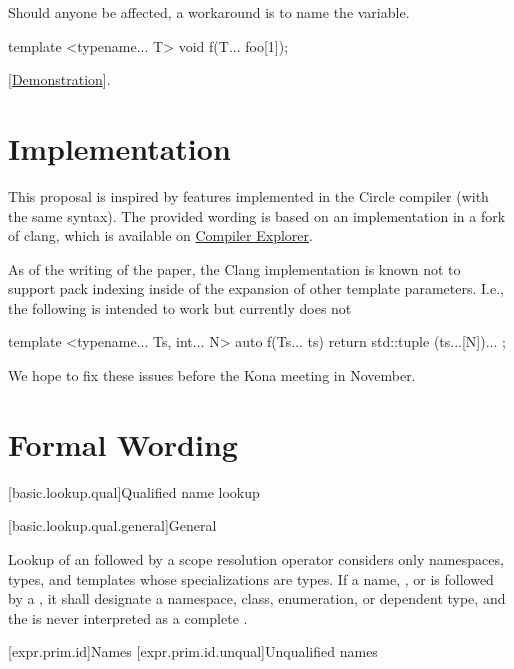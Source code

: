 \documentclass{wg21}
\begin{document}
Should anyone be affected, a workaround is to name the variable.

\begin{colorblock}
template <typename... T>
void f(T... foo[1]);
\end{colorblock}

[\href{https://godbolt.org/z/T7v3ETz1G}{Demonstration}].


\section{Implementation}

This proposal is inspired by features implemented in the Circle compiler (with the same syntax).
The provided wording is based on an implementation in a fork of clang, which is available on \href{https://compiler-explorer.com/z/WKobTEq6x}{Compiler Explorer}.

As of the writing of the paper, the Clang implementation is known not to support pack indexing inside of the expansion of other template parameters.
I.e., the following is intended to work but currently does not

\begin{colorblock}
template <typename... Ts, int... N>
auto f(Ts... ts) {
    return std::tuple{ (ts...[N])... };
}
\end{colorblock}

We hope to fix these issues before the Kona meeting in November.

\section{Formal Wording}

[basic.lookup.qual]{Qualified name lookup}

[basic.lookup.qual.general]{General}

\pnum
{}%
%
%
Lookup of an 
followed by a \tcode{::} scope resolution operator
considers only
namespaces, types, and templates whose specializations are types.
If a name, ,  or 
is followed by a \tcode{::},
it shall designate a namespace, class, enumeration, or dependent type,
and the \tcode{::} is never interpreted as
a complete .

[expr.prim.id]{Names}
[expr.prim.id.unqual]{Unqualified names}
\end{document}
